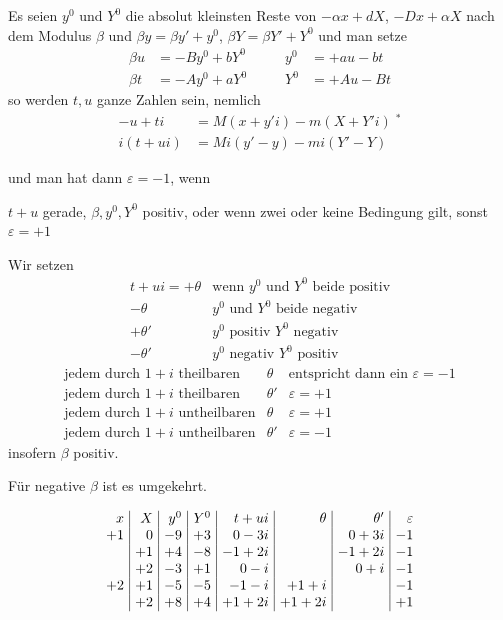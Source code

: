 Es seien $y^0$ und $Y^0$ die absolut kleinsten Reste von $-\alpha x+dX$, $-Dx+\alpha X$ nach dem Modulus $\beta$ und $\beta y=\beta y'+y^0$, $\beta Y=\beta Y'+Y^0$ und man setze
\[
\begin{alignedat}{2}
\beta u&=-By^0+bY^0\qquad&y^0&=+au-bt\\
\beta t&=-Ay^0+aY^0&Y^0&=+Au-Bt
\end{alignedat}
\]
so werden $t,u$ ganze Zahlen sein, nemlich
\[
\begin{aligned}
-u+ti&=M(x+y'i)-m(X+Y'i)\;{}^*\\
i(t+ui)&=Mi(y'-y)-mi(Y'-Y)
\end{aligned}
\]

und man hat dann $\varepsilon=-1$, wenn\par
\noindent $t+u$ gerade, $\beta,y^0,Y^0$ positiv, oder wenn zwei oder keine Bedingung gilt, sonst $\varepsilon=+1$\par
Wir setzen
\[
\begin{array}{rl}
t+ui=+\theta&\text{wenn }y^0\text{ und }Y^0\text{ beide positiv}\\
-\theta&y^0\text{ und }Y^0\text{ beide negativ}\\
+\theta'&y^0\text{ positiv }Y^0\text{ negativ}\\
-\theta'&y^0\text{ negativ }Y^0\text{ positiv}
\end{array}
\]
\[
\begin{array}{llr}
\text{jedem durch }1+i\text{ theilbaren}&\theta&\text{entspricht dann ein }\varepsilon=-1\\
\text{jedem durch }1+i\text{ theilbaren}&\theta'&\varepsilon=+1\\
\text{jedem durch }1+i\text{ untheilbaren}&\theta&\varepsilon=+1\\
\text{jedem durch }1+i\text{ untheilbaren}&\theta'&\varepsilon=-1
\end{array}
\]
insofern $\beta$ positiv.\par
Für negative $\beta$ ist es umgekehrt.

\[
\setlength{\arraycolsep}{4pt}
\begin{array}{r|r|r|r|r|r|r|r}
x&X&y^0&Y^0&t+ui&\theta&\theta'&\varepsilon\\
+1&0&-9&+3&0-3i&&0+3i&-1\\
&+1&+4&-8&-1+2i&&-1+2i&-1\\
&+2&-3&+1&0-i&&0+i&-1\\
+2&+1&-5&-5&-1-i&+1+i&&-1\\
&+2&+8&+4&+1+2i&+1+2i&&+1
\end{array}
\]

